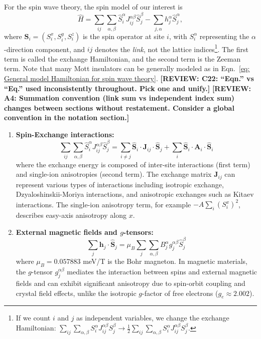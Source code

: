 \documentclass[aps, prx, nofootinbib, superscriptaddress]{revtex4-2}
\newcommand{\REVIEW}[1]{{\color{reviewcolor}\bfseries [REVIEW: #1]}}
\begin{document}
For the spin wave theory, the spin model of our interest is 
\begin{equation}\label{eq: General model Hamiltonian for spin wave theory}
    \hat{H} 
    = \sum_{ij} \sum_{\alpha, \beta} \hat{S}^{\alpha}_{i} J_{ij}^{\alpha\beta}  \hat{S}^{\beta}_{j}  
    -  \sum_{j, \alpha} h_{j}^{\alpha} \hat{S}^{\alpha}_{j},
\end{equation}
where $\mathbf{S}_{i} = (S^{x}_{i}, S^{y}_{i}, S_{i}^{z})$ is the spin operator at site $i$, with $S^\alpha_i$ representing the $\alpha$-direction component, and $ij$ denotes the \emph{link}, not the lattice indices\footnote{
    If we count $i$ and $j$ as independent variables, we change the exchange Hamiltonian: $\sum_{ij} \sum_{\alpha, \beta} S^{\alpha}_{i} J_{ij}^{\alpha\beta}  S^{\beta}_{j} \rightarrow \frac{1}{2} \sum_{ij} \sum_{\alpha, \beta} S^{\alpha}_{i} J_{ij}^{\alpha\beta} S^{\beta}_{j}$.
}.
The first term is called the exchange Hamiltonian, and the second term is the Zeeman term. 
Note that many Mott insulators can be generally modeled as in Eqn.~\eqref{eq: General model Hamiltonian for spin wave theory}.
\REVIEW{C22: ``Eqn.'' vs ``Eq.'' used inconsistently throughout. Pick one and unify.}
\REVIEW{A4: Summation convention (link sum vs independent index sum) changes between sections without restatement. Consider a global convention in the notation section.}
\begin{enumerate}[label=(\roman*)]
    \item \textbf{Spin-Exchange interactions:} 
    \begin{equation}
        \sum_{ij} \sum_{\alpha, \beta} \hat{S}^{\alpha}_{i} J_{ij}^{\alpha\beta}  \hat{S}^{\beta}_{j}  
        = \sum_{i \neq j} \hat{\mathbf{S}}_{i} \cdot \mathbf{J}_{ij} \cdot \hat{\mathbf{S}}_{j} + \sum_{i} \hat{\mathbf{S}}_{i} \cdot \mathbf{A}_{i} \cdot \hat{\mathbf{S}}_{i}
    \end{equation}
    where the exchange energy is composed of inter-site interactions (first term) and single-ion anisotropies (second term). The exchange matrix $\mathbf{J}_{ij}$ can represent various types of interactions including isotropic exchange, Dzyaloshinskii-Moriya interactions, and anisotropic exchanges such as Kitaev interactions. The single-ion anisotropy term, for example $- A \sum_{i} (S^{x}_{i})^{2}$, describes easy-axis anisotropy along $x$.
    
    \item \textbf{External magnetic fields and $g$-tensors:}
    \begin{equation}
        \sum_{j} \mathbf{h}_{j} \cdot \hat{\mathbf{S}}_{j} = \mu_B \sum_{j} \sum_{\alpha, \beta} B_{j}^{\alpha} g_{j}^{\alpha\beta} \hat{S}^{\beta}_{j}
    \end{equation}
    where $\mu_B = 0.057883$ meV/T is the Bohr magneton. In magnetic materials, the $g$-tensor $g_{j}^{\alpha\beta}$ mediates the interaction between spins and external magnetic fields and can exhibit significant anisotropy due to spin-orbit coupling and crystal field effects, unlike the isotropic $g$-factor of free electrons ($g_e \approx 2.002$).
\end{enumerate}
\end{document}
